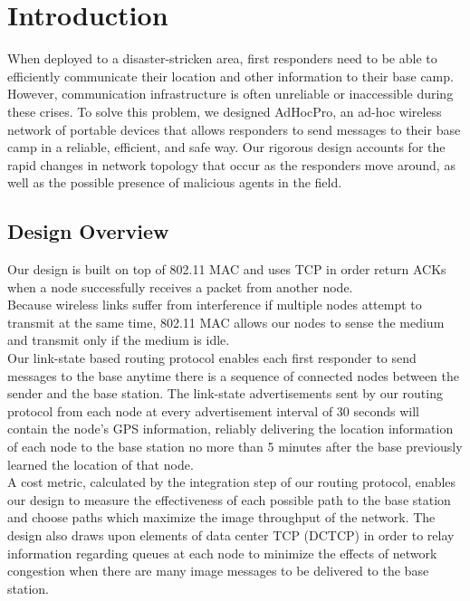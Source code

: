 \documentclass[letterpaper]{article}
\begin{document}
\section{Introduction}

When deployed to a disaster-stricken area, first responders need to be able to efficiently communicate their
location and other information to their base camp. However, communication infrastructure is often unreliable
or inaccessible during these crises. To solve this problem, we designed AdHocPro, an ad-hoc wireless network of
portable devices that allows responders to send messages to their base camp in a reliable, efficient, and safe
way. Our rigorous design accounts for the rapid changes in network topology that occur as the responders move 
around, as well as the possible presence of malicious agents in the field. 

\subsection{Design Overview}

Our design is built on top of 802.11 MAC and uses TCP in order return ACKs when a node successfully receives
a packet from another node.
\\

\noindent Because wireless links suffer from interference if multiple nodes attempt to transmit at the same time,
802.11 MAC allows our nodes to sense the medium and transmit only if the medium is idle.
\\

\noindent Our link-state based routing protocol enables each first responder to send messages to the base anytime
there is a sequence of connected nodes between the sender and the base station. The link-state advertisements 
sent by our routing protocol from each node at every advertisement interval of 30 seconds will contain the node's
GPS  information, reliably delivering the location information of each node to the base station no more than
5 minutes after the base previously learned the location of that node.
\\

\noindent A cost metric, calculated by the integration step of our routing protocol, enables our design to measure
the effectiveness of each possible path to the base station and choose paths which maximize the image 
throughput of the network. The design also draws upon elements of data center TCP (DCTCP) in order to relay 
information regarding queues at each node to minimize the effects of network congestion when there are many
image messages to be delivered to the base station. 
\\
\end{document}
